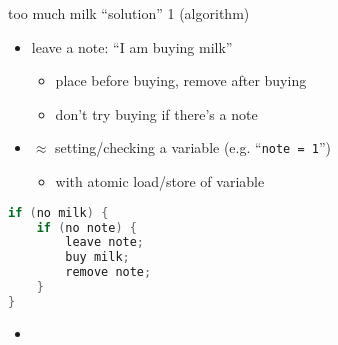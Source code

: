 \usetikzlibrary{arrows.meta}
\begin{frame}[fragile,label=solutionOne]{too much milk ``solution'' 1 (algorithm)}
\begin{itemize}
\item leave a note: ``I am buying milk''
    \begin{itemize}
    \item place before buying, remove after buying
    \item don't try buying if there's a note
    \end{itemize}
\item $\approx$ setting/checking a variable (e.g. ``\texttt{note = 1}'')
\begin{itemize}\item with atomic load/store of variable\end{itemize}
\end{itemize}
\begin{lstlisting}[language=C++,style=small]
if (no milk) {
    if (no note) {
        leave note;
        buy milk;
        remove note;
    }
}
\end{lstlisting}
\begin{itemize}
\item<2-> 
\end{itemize}
\end{frame}

